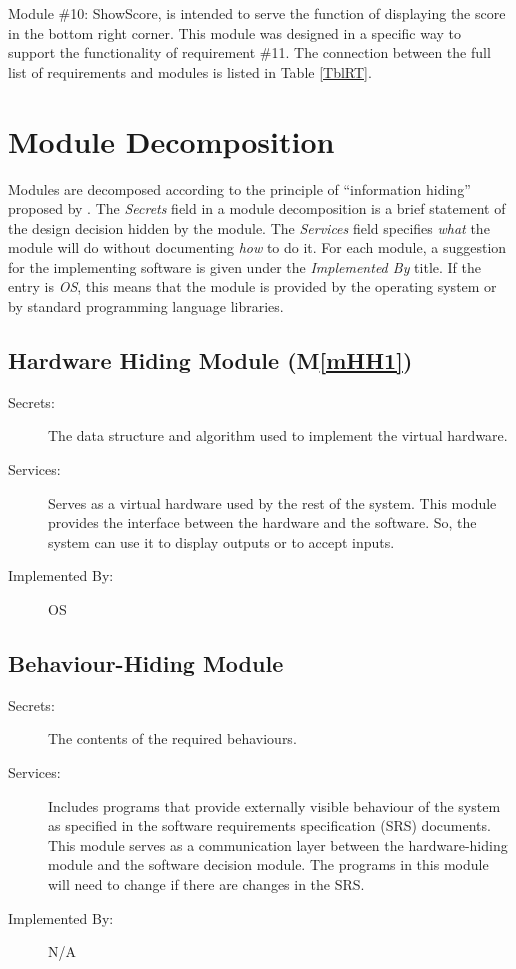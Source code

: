\documentclass[12pt, titlepage]{article}
\newcommand{\mref}[1]{M\ref{#1}}
\begin{document}
Module \#10: ShowScore, is intended to serve the function of displaying the score in the bottom right corner. This module was designed in a specific way to support the functionality of requirement \#11. The connection between the full list of requirements and modules is listed in Table \ref{TblRT}.

\section{Module Decomposition} \label{SecMD}

Modules are decomposed according to the principle of ``information hiding''
proposed by \citet{ParnasEtAl1984}. The \emph{Secrets} field in a module
decomposition is a brief statement of the design decision hidden by the
module. The \emph{Services} field specifies \emph{what} the module will do
without documenting \emph{how} to do it. For each module, a suggestion for the
implementing software is given under the \emph{Implemented By} title. If the
entry is \emph{OS}, this means that the module is provided by the operating
system or by standard programming language libraries.

\subsection{Hardware Hiding Module (\mref{mHH1})}
\begin{description}
\item[Secrets:]The data structure and algorithm used to implement the virtual
  hardware.
\item[Services:]Serves as a virtual hardware used by the rest of the
  system. This module provides the interface between the hardware and the
  software. So, the system can use it to display outputs or to accept inputs.
\item[Implemented By:] OS
\end{description}

\subsection{Behaviour-Hiding Module}
\begin{description}
\item[Secrets:]The contents of the required behaviours.
\item[Services:]Includes programs that provide externally visible behaviour of
  the system as specified in the software requirements specification (SRS)
  documents. This module serves as a communication layer between the
  hardware-hiding module and the software decision module. The programs in this
  module will need to change if there are changes in the SRS.
\item[Implemented By:] N/A
\end{description}
\end{document}
